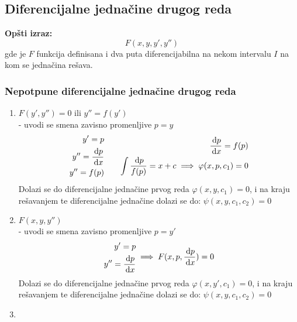 \subsection{Diferencijalne jednačine drugog reda}

\textbf{Opšti izraz:}
$$ F(x, y, y', y'') $$
gde je $F$ funkcija definisana i dva puta diferencijabilna na nekom intervalu $I$ na kom se jednačina rešava.

\subsubsection{Nepotpune diferencijalne jednačine drugog reda}
\begin{enumerate}[label = \textbf{\arabic*. slučaj}] 
	\item 
		$ F(y', y'') = 0 $ ili $ y'' = f(y') $\\
		- uvodi se smena zavisno promenljive $ p = y $\\
		\begin{align*}
			\begin{aligned}
				y' = p\\
				y'' = \frac{\, \mathrm{d} p}{\, \mathrm{d} x}\\
				y'' = f(p)\\
			\end{aligned}
			\quad \quad
			\begin{aligned}
			\frac{\, \mathrm{d} p}{\, \mathrm{d} x} = f(p)\\
			\int \frac{\, \mathrm{d} p}{f(p)} = x + c \implies \varphi (x, p, c_1) = 0
			\end{aligned}
		\end{align*}
		Dolazi se do diferencijalne jednačine prvog reda $ \varphi (x, y, c_1) = 0 $, i na kraju rešavanjem te diferencijalne jednačine dolazi se do: $\psi (x, y, c_1, c_2) = 0$
	\item 
		$ F(x, y, y'') $\\
		- uvodi se smena zavisno promenljive $ p = y' $\\
		\begin{align*}
		\begin{aligned}
		y' = p\\
		y'' = \frac{\, \mathrm{d} p}{\, \mathrm{d} x}
		\end{aligned}
		\implies F(x, p, \frac{\, \mathrm{d} p}{\, \mathrm{d} x}) = 0
		\end{align*}
		Dolazi se do diferencijalne jednačine prvog reda $ \varphi (x, y', c_1) = 0 $, i na kraju rešavanjem te diferencijalne jednačine dolazi se do: $\psi (x, y, c_1, c_2) = 0$
	\item 

\end{enumerate}
